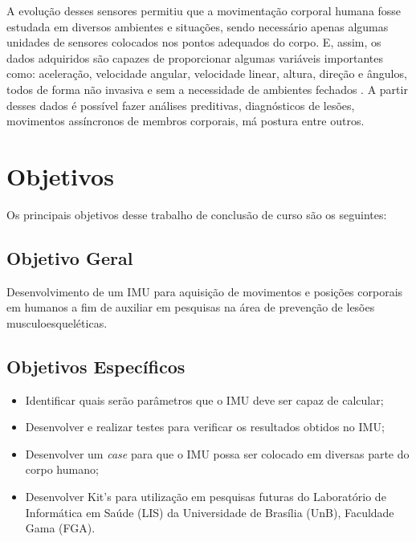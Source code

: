 A evolução desses sensores permitiu que a movimentação corporal humana fosse estudada em diversos ambientes e situações, sendo necessário apenas algumas unidades de sensores colocados nos pontos adequados do corpo. E, assim, os dados adquiridos são capazes de proporcionar algumas variáveis importantes como: aceleração, velocidade angular, velocidade linear, altura, direção e ângulos, todos de forma não invasiva e sem a necessidade de ambientes fechados \cite{chang2016}. A partir desses dados é possível fazer análises preditivas, diagnósticos de lesões, movimentos assíncronos de membros corporais, má postura entre outros.



\section{Objetivos}

Os principais objetivos desse trabalho de conclusão de curso são os seguintes:

\subsection{Objetivo Geral}

Desenvolvimento de um IMU para aquisição de movimentos e posições corporais em humanos a fim de auxiliar em pesquisas na área de prevenção de lesões musculoesqueléticas.

\subsection {Objetivos Específicos} 
 \begin{itemize} 
		\item Identificar quais serão parâmetros que o IMU deve ser capaz de calcular;
		
		\item Desenvolver e realizar testes para verificar os resultados obtidos no IMU;
		
		\item Desenvolver um \textit{case} para que o IMU possa ser colocado em diversas parte do corpo humano;
		
		\item Desenvolver Kit's para utilização em pesquisas futuras do Laboratório de Informática em Saúde (LIS) da Universidade de Brasília (UnB), Faculdade Gama (FGA).
		
		
	\end{itemize}
